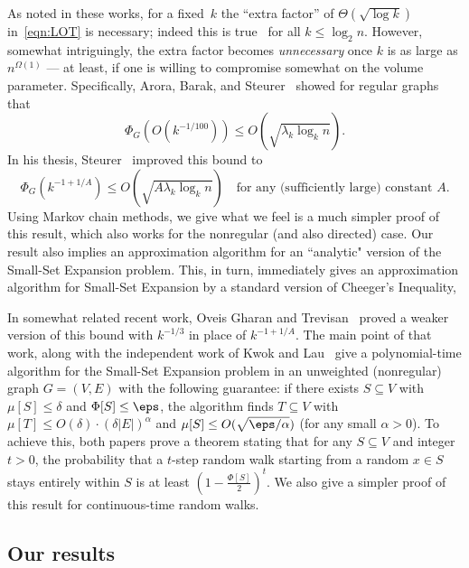 \documentclass[11pt]{article}
\newcommand{\Bdry}{\Phi}
\newcommand{\Spars}{\mu}
\begin{document}
As noted in these works, for a fixed~$k$ the ``extra factor'' of $\Theta(\sqrt{\log k})$ in~\eqref{eqn:LOT} is necessary; indeed this is true~\cite{LOT12} for all $k \leq \log_2 n$.  However, somewhat intriguingly, the extra factor becomes \emph{unnecessary} once $k$ is as large as $n^{\Omega(1)}$ --- at least, if one is willing to compromise somewhat on the volume parameter.  Specifically, Arora, Barak, and Steurer~\cite{ABS10} showed for regular graphs that
\begin{equation} \label{eqn:ABS}
    \Phi_G(O(k^{-1/100})) \leq O(\sqrt{\lambda_k \log_k n}).
\end{equation}
In his thesis, Steurer~\cite{Ste10a} improved this bound to
\begin{equation}
\Phi_G(k^{-1+1/A}) \leq O(\sqrt{A \lambda_k \log_k n}) \quad \text{for any (sufficiently large) constant $A$.}
\end{equation}
Using Markov chain methods, we give what we feel is a much simpler proof of this result, which also works for the nonregular (and also directed) case.  Our result also implies an approximation algorithm for an ``analytic" version of the Small-Set Expansion problem.  This, in turn, immediately gives an approximation algorithm for Small-Set Expansion by a standard version of Cheeger's Inequality,

In somewhat related recent work, Oveis Gharan and Trevisan~\cite{OT12} proved a weaker version of this bound with $k^{-1/3}$ in place of $k^{-1+1/A}$.  The main point of that work, along with the independent work of Kwok and Lau~\cite{KL12} give a polynomial-time algorithm for the Small-Set Expansion problem in an unweighted (nonregular) graph $G = (V,E)$ with the following guarantee:  if there exists $S \subseteq V$ with $\Spars[S] \leq \delta$ and $\Bdry[S] \leq \eps$, the algorithm finds $T \subseteq V$ with $\Spars[T] \leq O(\delta) \cdot (\delta |E|)^{\alpha}$ and $\Spars[S] \leq O(\sqrt{\eps/\alpha})$ (for any small $\alpha > 0$).  To achieve this, both papers prove a theorem stating that for any $S \subseteq V$ and integer $t > 0$, the probability that a $t$-step random walk starting from a random $x \in S$ stays entirely within $S$ is at least  $\left(1-\frac{\Phi[S]}{2}\right)^t$.  We also give a simpler proof of this result for continuous-time random walks.


\subsection{Our results}
\end{document}
